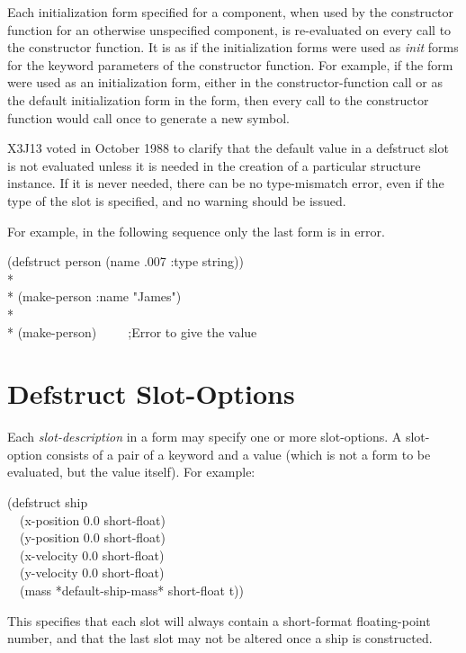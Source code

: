 Each initialization form specified for a  component,
when used by the constructor function for an otherwise unspecified
component, is re-evaluated on every call to the
constructor function.  It is as if the initialization forms were
used as {\it init} forms for the keyword parameters of the
constructor function.
For example, if the form 
were used as an initialization form,
either in the constructor-function call or as the default initialization form
in the  form,
then every call to the constructor
function would call  once to generate a new symbol.

\begin{newer}
X3J13 voted in October 1988 
to clarify that the default value in a defstruct slot is not evaluated 
        unless it is needed in the creation of a particular structure
        instance.  If it is never needed, there can be no type-mismatch
        error, even if the type of the slot is specified, and no warning
        should be issued.


For example, in the following sequence only the last form is in error.
\begin{lisp}
(defstruct person (name .007 :type string)) \\*
\\*
(make-person :name "James") \\*
\\*
(make-person)~~~~~;{\rm Error to give  the value }
\end{lisp}
\end{newer}


\section{Defstruct Slot-Options}
\label{Defstruct-Slot-Options}

Each {\it slot-description} in a  form may specify one or more
slot-options.  A slot-option consists of a pair of a keyword and
a value (which is not a form to be evaluated, but the value itself).
For example:
\begin{lisp}
(defstruct ship \\
~~(x-position 0.0  short-float) \\
~~(y-position 0.0  short-float) \\
~~(x-velocity 0.0  short-float) \\
~~(y-velocity 0.0  short-float) \\
~~(mass *default-ship-mass*  short-float  t))
\end{lisp}
This specifies that each slot will always contain a
short-format floating-point number,
and that the last slot may not be altered once a ship is constructed.

